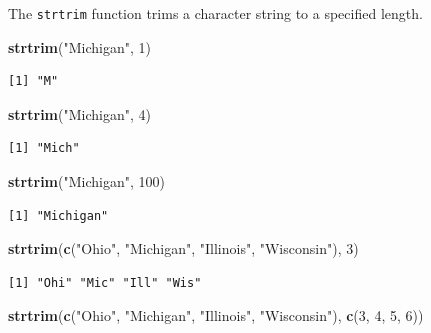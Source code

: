 \documentclass[
]{krantz}
\makeatletter
\newenvironment{Shaded}{\begin{snugshade}}{\end{snugshade}}
\newcommand{\DecValTok}[1]{\textcolor[rgb]{0.06,0.06,0.06}{#1}}
\newcommand{\KeywordTok}[1]{\textcolor[rgb]{0.27,0.27,0.27}{\textbf{#1}}}
\newcommand{\NormalTok}[1]{#1}
\newcommand{\StringTok}[1]{\textcolor[rgb]{0.5,0.5,0.5}{#1}}
\newenvironment{kframe}{%
\medskip{}
\setlength{\fboxsep}{.8em}
 \def\at@end@of@kframe{}%
 \ifinner\ifhmode%
  \def\at@end@of@kframe{\end{minipage}}%
  \begin{minipage}{\columnwidth}%
 \fi\fi%
 \def\FrameCommand##1{\hskip\@totalleftmargin \hskip-\fboxsep
 \colorbox{shadecolor}{##1}\hskip-\fboxsep
     \hskip-\linewidth \hskip-\@totalleftmargin \hskip\columnwidth}%
 \MakeFramed {\advance\hsize-\width
   \@totalleftmargin\z@ \linewidth\hsize
   \@setminipage}}%
 {\par\unskip\endMakeFramed%
 \at@end@of@kframe}
\renewenvironment{Shaded}{\begin{kframe}}{\end{kframe}}
\makeatother
\begin{document}
The \texttt{strtrim} function trims a character string to a specified length.

\begin{Shaded}
\begin{Highlighting}[]
\KeywordTok{strtrim}\NormalTok{(}\StringTok{"Michigan"}\NormalTok{, }\DecValTok{1}\NormalTok{)}
\end{Highlighting}
\end{Shaded}

\begin{verbatim}
[1] "M"
\end{verbatim}

\begin{Shaded}
\begin{Highlighting}[]
\KeywordTok{strtrim}\NormalTok{(}\StringTok{"Michigan"}\NormalTok{, }\DecValTok{4}\NormalTok{)}
\end{Highlighting}
\end{Shaded}

\begin{verbatim}
[1] "Mich"
\end{verbatim}

\begin{Shaded}
\begin{Highlighting}[]
\KeywordTok{strtrim}\NormalTok{(}\StringTok{"Michigan"}\NormalTok{, }\DecValTok{100}\NormalTok{)}
\end{Highlighting}
\end{Shaded}

\begin{verbatim}
[1] "Michigan"
\end{verbatim}

\begin{Shaded}
\begin{Highlighting}[]
\KeywordTok{strtrim}\NormalTok{(}\KeywordTok{c}\NormalTok{(}\StringTok{"Ohio"}\NormalTok{, }\StringTok{"Michigan"}\NormalTok{, }\StringTok{"Illinois"}\NormalTok{, }\StringTok{"Wisconsin"}\NormalTok{), }\DecValTok{3}\NormalTok{)}
\end{Highlighting}
\end{Shaded}

\begin{verbatim}
[1] "Ohi" "Mic" "Ill" "Wis"
\end{verbatim}

\begin{Shaded}
\begin{Highlighting}[]
\KeywordTok{strtrim}\NormalTok{(}\KeywordTok{c}\NormalTok{(}\StringTok{"Ohio"}\NormalTok{, }\StringTok{"Michigan"}\NormalTok{, }\StringTok{"Illinois"}\NormalTok{, }\StringTok{"Wisconsin"}\NormalTok{), }\KeywordTok{c}\NormalTok{(}\DecValTok{3}\NormalTok{, }\DecValTok{4}\NormalTok{, }\DecValTok{5}\NormalTok{, }\DecValTok{6}\NormalTok{))}
\end{Highlighting}
\end{Shaded}
\end{document}
